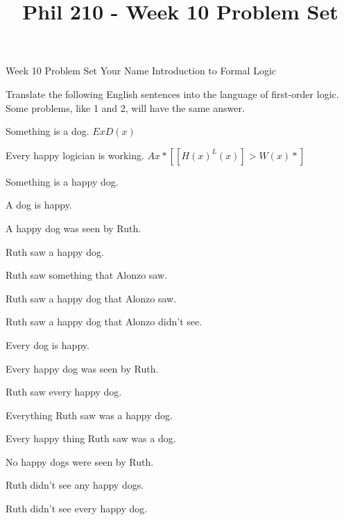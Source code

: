 
\title{Phil 210 - Week 10 Problem Set}

\heading
Week 10 Problem Set
Your Name
Introduction to Formal Logic
\endheading

Translate the following English sentences into the language of first-order logic. Some problems, like 1 and 2, will have the same answer.

\quantifiers
\problems
{}
Something is a dog.
        \answer 
        $ Ex D(x) $
        \endanswer\Bigskip

Every happy logician is working.
        \answer 
        $ Ax*[[H(x) ^ L(x)] > W(x)*] $
        \endanswer

Something is a happy dog.
        \answer
        $ $
        \endanswer

A dog is happy.
        \answer
        $ $
        \endanswer

A happy dog was seen by Ruth.
        \answer
        $ $
        \endanswer

Ruth saw a happy dog.
        \answer
        $ $
        \endanswer

Ruth saw something that Alonzo saw.
        \answer
        $ $
        \endanswer

Ruth saw a happy dog that Alonzo saw.
        \answer
        $ $
        \endanswer

Ruth saw a happy dog that Alonzo didn't see.
        \answer
        $ $
        \endanswer

Every dog is happy.
        \answer
        $ $
        \endanswer

Every happy dog was seen by Ruth.
        \answer
        $ $
        \endanswer

Ruth saw every happy dog.
        \answer
        $ $
        \endanswer

Everything Ruth saw was a happy dog.
        \answer
        $ $
        \endanswer

Every happy thing Ruth saw was a dog.
        \answer
        $ $
        \endanswer

No happy dogs were seen by Ruth.
        \answer
        $ $
        \endanswer

Ruth didn't see any happy dogs.
        \answer
        $ $
        \endanswer

Ruth didn't see every happy dog.
        \answer
        $ $
        \endanswer

